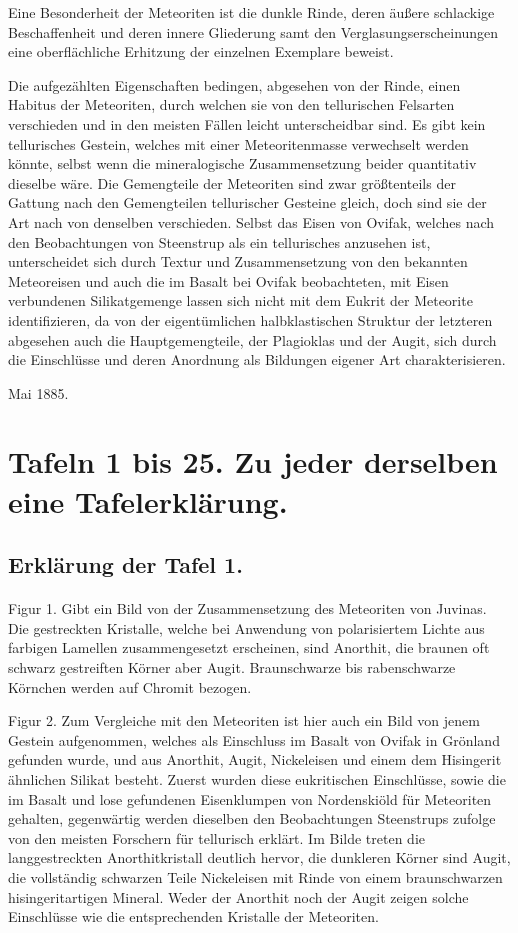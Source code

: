 \documentclass[a4paper, 12pt, oneside]{article}
\begin{document}
Eine Besonderheit der Meteoriten ist die dunkle Rinde, deren äußere schlackige Beschaffenheit und deren innere Gliederung samt den Verglasungserscheinungen eine oberflächliche Erhitzung der einzelnen Exemplare beweist.

Die aufgezählten Eigenschaften bedingen, abgesehen von der Rinde, einen Habitus der Meteoriten, durch welchen sie von den tellurischen Felsarten verschieden und in den meisten Fällen leicht unterscheidbar sind. Es gibt kein tellurisches Gestein, welches mit einer Meteoritenmasse verwechselt werden könnte, selbst wenn die mineralogische Zusammensetzung beider quantitativ dieselbe wäre. Die Gemengteile der Meteoriten sind zwar größtenteils der Gattung nach den Gemengteilen tellurischer Gesteine gleich, doch sind sie der Art nach von denselben verschieden. Selbst das Eisen von Ovifak, welches nach den Beobachtungen von Steenstrup als ein tellurisches anzusehen ist, unterscheidet sich durch Textur und Zusammensetzung von den bekannten Meteoreisen und auch die im Basalt bei Ovifak beobachteten, mit Eisen verbundenen Silikatgemenge lassen sich nicht mit dem Eukrit der Meteorite identifizieren, da von der eigentümlichen halbklastischen Struktur der letzteren abgesehen auch die Hauptgemengteile, der Plagioklas und der Augit, sich durch die Einschlüsse und deren Anordnung als Bildungen eigener Art charakterisieren.

Mai 1885.
\clearpage
\pagestyle{fancy}
\fancyhf{}
\section{Tafeln 1 bis 25. Zu jeder derselben eine Tafelerklärung.}
\subsection{Erklärung der Tafel 1.}
\paragraph{}
Figur 1. Gibt ein Bild von der Zusammensetzung des Meteoriten von Juvinas. Die gestreckten Kristalle, welche bei Anwendung von polarisiertem Lichte aus farbigen Lamellen zusammengesetzt erscheinen, sind Anorthit, die braunen oft schwarz gestreiften Körner aber Augit. Braunschwarze bis rabenschwarze Körnchen werden auf Chromit bezogen.

Figur 2. Zum Vergleiche mit den Meteoriten ist hier auch ein Bild von jenem Gestein aufgenommen, welches als Einschluss im Basalt von Ovifak in Grönland gefunden wurde, und aus Anorthit, Augit, Nickeleisen und einem dem Hisingerit ähnlichen Silikat besteht. Zuerst wurden diese eukritischen Einschlüsse, sowie die im Basalt und lose gefundenen Eisenklumpen von Nordenskiöld für Meteoriten gehalten, gegenwärtig werden dieselben den Beobachtungen Steenstrups zufolge von den meisten Forschern für tellurisch erklärt. Im Bilde treten die langgestreckten Anorthitkristall deutlich hervor, die dunkleren Körner sind Augit, die vollständig schwarzen Teile Nickeleisen mit Rinde von einem braunschwarzen hisingeritartigen Mineral. Weder der Anorthit noch der Augit zeigen solche Einschlüsse wie die entsprechenden Kristalle der Meteoriten.
\end{document}
